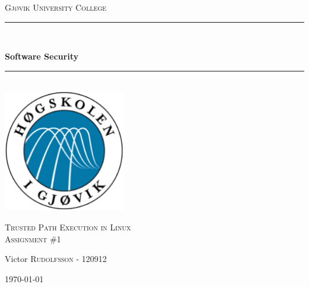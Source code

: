 \documentclass[12pt]{article} %
\begin{document}

\begin{titlepage}

\newcommand{\HRule}{\rule{\linewidth}{0.5mm}} %

\center %
\begin{myfont}
\textsc{{\large Gjøvik University College}}\\[0.5cm] %
\end{myfont}
\HRule \\[0.4cm]

\begin{myfont}
{ \huge \bfseries Software Security}\\[0cm] %
\end{myfont}

\HRule \\[0.4cm]
\includegraphics[width=200px, height=200px]{logo}\\[0.8cm] %
\begin{myfont}
\textsc{\Large Trusted Path Execution in Linux}\\[0.5cm] %
\textsc{\large Assignment \#1}\\[0.5cm] %
\end{myfont}


\begin{minipage}{0.44\textwidth}
\begin{flushleft} \large
\begin{myfont}
Victor \textsc{Rudolfsson} - 120912\\ %
\end{myfont}
\end{flushleft}
\end{minipage}

\vfill %
{\large \today}\\[3cm] %

\end{titlepage}
\end{document}
